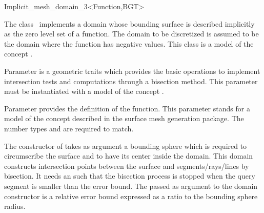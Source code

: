 \ccRefPageBegin


\begin{ccRefClass}{Implicit_mesh_domain_3<Function,BGT>}  %


\ccDefinition
  
The class \ccRefName\ implements a domain whose bounding surface is
described
implicitly as the zero level set of a function.
The domain to be discretized is assumed to be the domain where
the function has negative values.
This class is a model of the concept .

\ccParameters
Parameter  is a geometric traits which provides
the basic operations to implement
intersection tests and computations 
through a bisection method. This parameter must be instantiated
with a model of the concept .

 
Parameter  provides the definition of the function.
This parameter stands for a model of the concept 
 described in the
surface mesh generation package. 
The number types   
and   are required to match.

The constructor of \ccRefName{}
takes as argument a bounding sphere which is required
to circumscribe the surface and to have its center inside the 
 domain. 
This domain constructs intersection points  
between
the surface and segments/rays/lines by 
bisection. It needs an 
 such that the bisection process is stopped
when the query segment is smaller than the error bound.
The  passed as argument to the domain constructor
is a relative error bound expressed as a ratio to the bounding sphere radius.




\end{ccRefClass}
